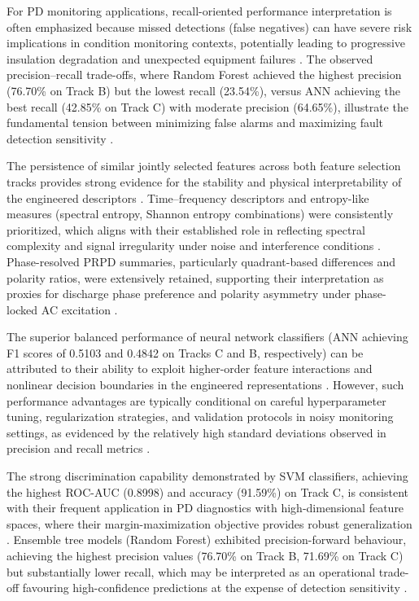 For PD monitoring applications, recall-oriented performance interpretation is often emphasized because missed detections (false negatives) can have severe risk implications in condition monitoring contexts, potentially leading to progressive insulation degradation and unexpected equipment failures \parencite{Hussain_2021, Adhikari_2024}. The observed precision--recall trade-offs, where Random Forest achieved the highest precision (76.70\% on Track B) but the lowest recall (23.54\%), versus ANN achieving the best recall (42.85\% on Track C) with moderate precision (64.65\%), illustrate the fundamental tension between minimizing false alarms and maximizing fault detection sensitivity \parencite{Zemouri_2023_1, Adhikari_2024}.

The persistence of similar jointly selected features across both feature selection tracks provides strong evidence for the stability and physical interpretability of the engineered descriptors \parencite{Seitz_2024_1, Zhang_2024_28}. Time--frequency descriptors and entropy-like measures (spectral entropy, Shannon entropy combinations) were consistently prioritized, which aligns with their established role in reflecting spectral complexity and signal irregularity under noise and interference conditions \parencite{Bao_2024_1, Friebe_2024}. Phase-resolved PRPD summaries, particularly quadrant-based differences and polarity ratios, were extensively retained, supporting their interpretation as proxies for discharge phase preference and polarity asymmetry under phase-locked AC excitation \parencite{Orellana_2023_1, Seitz_2024_1}.

The superior balanced performance of neural network classifiers (ANN achieving F1 scores of 0.5103 and 0.4842 on Tracks C and B, respectively) can be attributed to their ability to exploit higher-order feature interactions and nonlinear decision boundaries in the engineered representations \parencite{Aldosari_2023, Srivastava_2023_1}. However, such performance advantages are typically conditional on careful hyperparameter tuning, regularization strategies, and validation protocols in noisy monitoring settings, as evidenced by the relatively high standard deviations observed in precision and recall metrics \parencite{Srivastava_2023_1, Klein_2024_1}.

The strong discrimination capability demonstrated by SVM classifiers, achieving the highest ROC-AUC (0.8998) and accuracy (91.59\%) on Track C, is consistent with their frequent application in PD diagnostics with high-dimensional feature spaces, where their margin-maximization objective provides robust generalization \parencite{Govindarajan_2021_2, Aldosari_2023}. Ensemble tree models (Random Forest) exhibited precision-forward behaviour, achieving the highest precision values (76.70\% on Track B, 71.69\% on Track C) but substantially lower recall, which may be interpreted as an operational trade-off favouring high-confidence predictions at the expense of detection sensitivity \parencite{Zemouri_2023_1, Adhikari_2024}.


